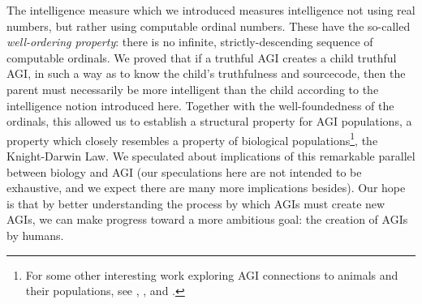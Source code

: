 \documentclass[runningheads]{llncs}
\begin{document}
The intelligence measure which we introduced measures intelligence not using real
numbers, but rather using computable ordinal numbers. These have the so-called
\emph{well-ordering property}: there is no infinite, strictly-descending sequence
of computable ordinals. We proved that if a truthful AGI creates
a child truthful AGI, in such a way as to know the child's truthfulness and sourcecode,
then the parent must necessarily be more intelligent than the child according
to the intelligence notion introduced here. Together with the well-foundedness
of the ordinals, this allowed us to establish a structural property for AGI populations,
a property which closely resembles a property of biological populations\footnote{For
some other interesting work exploring AGI connections to animals and their
populations,
see \cite{beyret2019animal}, \cite{strannegaard2018learning},
and \cite{yoshida2017homeostatic}.}, the Knight-Darwin
Law. We speculated about implications of this remarkable parallel between biology and
AGI (our speculations here are not intended to be exhaustive, and we expect there
are many more implications besides). Our hope is that by better understanding
the process by which AGIs must create new AGIs, we can make progress toward a more
ambitious goal: the creation of AGIs by humans.




\end{document}
